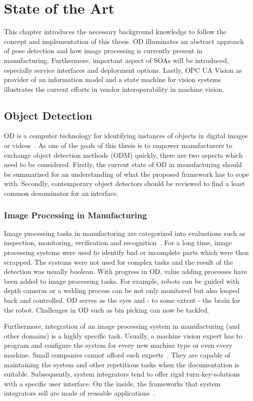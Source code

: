\chapter{State of the Art\label{cha:chapter2}}
This chapter introduces the necessary background knowledge to follow the concept and implementation of this thesis. OD illuminates an abstract approach of pose detection and how image processing is currently present in manufacturing. Furthermore, important aspect of SOAs will be introduced, especially service interfaces and deployment options. Lastly, OPC UA Vision as provider of an information model and a state machine for vision systems illustrates the current efforts in vendor interoperability in machine vision.

\section{Object Detection}
OD is a computer technology for identifying instances of objects in digital images or videos~\cite{Hornberg2017HandbookVision}. As one of the goals of this thesis is to empower manufacturers to exchange object detection methods (ODM) quickly, there are two aspects which need to be considered. Firstly, the current state of OD in manufacturing should be summarized for an understanding of what the proposed framework has to cope with. Secondly, contemporary object detectors should be reviewed to find a least common denominator for an interface.

\subsection{Image Processing in Manufacturing}
Image processing tasks in manufactoring are categorized into evaluations such as inspection, monitoring, verification and recognition~\cite{Hornberg2017HandbookVision}. For a long time, image processing systems were used to identify bad or incomplete parts which were then scrapped. The systems were not used for complex tasks and the result of the detection was usually boolean. With progress in OD, value adding processes have been added to image processing tasks. For example, robots can be guided with depth cameras or a welding process can be not only monitored but also looped back and controlled. OD serves as the eyes and - to some extent - the brain for the robot. Challenges in OD such as bin picking can now be tackled. 

Furthermore, integration of an image processing system in manufacturing (and other domains) is a highly specific task. Usually, a machine vision expert has to program and configure the system for every new machine type or even every machine. Small companies cannot afford such experts~\cite{Hornberg2017HandbookVision}. They are capable of maintaining the system and other repetitious tasks when the documentation is suitable. Subsequently, system integrators tend to offer rigid turn-key-solutions with a specific user interface. On the inside, the frameworks that system integrators sell are made of reusable applications~\cite{Hornberg2017HandbookVision}.

